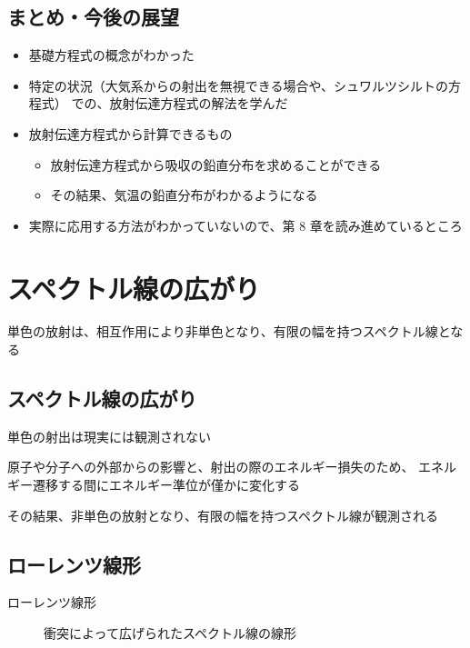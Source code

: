 \documentclass[article,nontitlepage,]{dennou777}
\begin{document}
\subsection{まとめ・今後の展望}
\begin{itemize}
	\item 基礎方程式の概念がわかった
	\item 特定の状況（大気系からの射出を無視できる場合や、シュワルツシルトの方程式）
		での、放射伝達方程式の解法を学んだ
	\item 放射伝達方程式から計算できるもの
		\begin{itemize}
			\item 放射伝達方程式から吸収の鉛直分布を求めることができる
			\item その結果、気温の鉛直分布がわかるようになる
		\end{itemize}
	\item 実際に応用する方法がわかっていないので、第 8 章を読み進めているところ
\end{itemize}

\section{スペクトル線の広がり}
単色の放射は、相互作用により非単色となり、有限の幅を持つスペクトル線となる

\subsection{スペクトル線の広がり}
単色の射出は現実には観測されない

原子や分子への外部からの影響と、射出の際のエネルギー損失のため、
エネルギー遷移する間にエネルギー準位が僅かに変化する

その結果、非単色の放射となり、有限の幅を持つスペクトル線が観測される

\subsection{ローレンツ線形}
\begin{description}
	\item[ローレンツ線形] 衝突によって広げられたスペクトル線の線形
\end{description}
\end{document}
